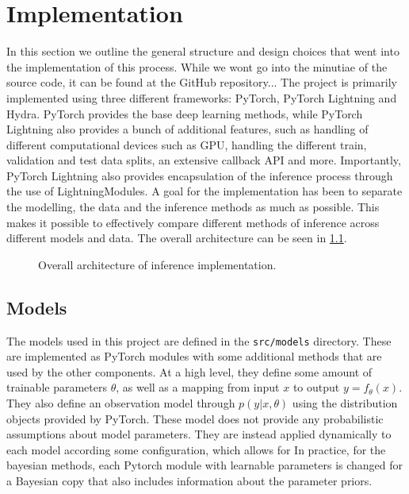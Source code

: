 \chapter{Implementation}


In this section we outline the general structure and design choices that went into the implementation of this process. 
While we wont go into the minutiae of the source code, it can be found at the GitHub repository...
The project is primarily implemented using three different frameworks: PyTorch, PyTorch Lightning and Hydra.
PyTorch provides the base deep learning methods, while PyTorch Lightning also provides a bunch of additional features, such as handling of different computational devices such as GPU, handling the different train, validation and test data splits, an extensive callback API and more.
Importantly, PyTorch Lightning also provides encapsulation of the inference process through the use of LightningModules.
A goal for the implementation has been to separate the modelling, the data and the inference methods as much as possible.
This makes it possible to effectively compare different methods of inference across different models and data.
The overall architecture can be seen in \cref{fig:sw-arch}.
\begin{figure}[htbp]
    \centering
    
    \caption{Overall architecture of inference implementation. }
    \label{fig:sw-arch}
\end{figure}

\section{Models}
The models used in this project are defined in the \texttt{src/models} directory.
These are implemented as PyTorch modules with some additional methods that are used by the other components. 
At a high level, they define some amount of trainable parameters $\theta$, as well as a mapping from input $x$ to output $y=f_\theta(x)$. 
They also define an observation model through $p(y|x, \theta)$ using the distribution objects provided by PyTorch.
These model does not provide any probabilistic assumptions about model parameters.
They are instead applied dynamically to each model according some configuration, which allows for 
In practice, for the bayesian methods, each Pytorch module with learnable parameters is changed for a Bayesian copy that also includes information about the parameter priors.

